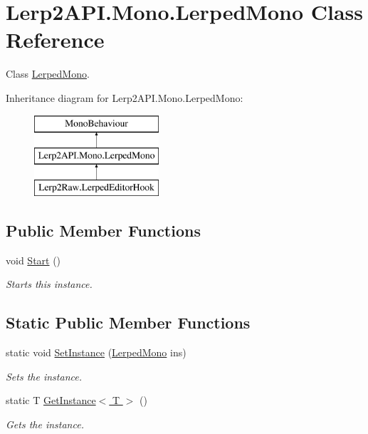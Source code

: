 \hypertarget{class_lerp2_a_p_i_1_1_mono_1_1_lerped_mono}{}\section{Lerp2\+A\+P\+I.\+Mono.\+Lerped\+Mono Class Reference}
\label{class_lerp2_a_p_i_1_1_mono_1_1_lerped_mono}


Class \hyperlink{class_lerp2_a_p_i_1_1_mono_1_1_lerped_mono}{Lerped\+Mono}.  


Inheritance diagram for Lerp2\+A\+P\+I.\+Mono.\+Lerped\+Mono\+:\begin{figure}[H]
\begin{center}
\leavevmode
\includegraphics[height=3.000000cm]{class_lerp2_a_p_i_1_1_mono_1_1_lerped_mono}
\end{center}
\end{figure}
\subsection*{Public Member Functions}
\begin{DoxyCompactItemize}
\item 
void \hyperlink{class_lerp2_a_p_i_1_1_mono_1_1_lerped_mono_adb4749c8a1e4c6b7d38e60c2884a1d49}{Start} ()
\begin{DoxyCompactList}\small\item\em Starts this instance. \end{DoxyCompactList}\end{DoxyCompactItemize}
\subsection*{Static Public Member Functions}
\begin{DoxyCompactItemize}
\item 
static void \hyperlink{class_lerp2_a_p_i_1_1_mono_1_1_lerped_mono_ae990bb6044872631869b3279e875f1a2}{Set\+Instance} (\hyperlink{class_lerp2_a_p_i_1_1_mono_1_1_lerped_mono}{Lerped\+Mono} ins)
\begin{DoxyCompactList}\small\item\em Sets the instance. \end{DoxyCompactList}\item 
static T \hyperlink{class_lerp2_a_p_i_1_1_mono_1_1_lerped_mono_afe3ab7d89480e841defb5a7a31a06d07}{Get\+Instance$<$ T $>$} ()
\begin{DoxyCompactList}\small\item\em Gets the instance. \end{DoxyCompactList}\end{DoxyCompactItemize}
